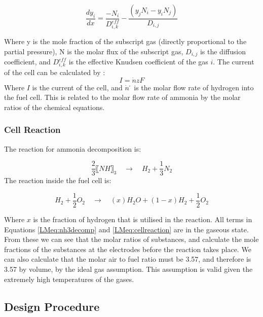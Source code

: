 \documentclass{article}
\begin{document}
\begin{equation}
\frac{dy_{i}}{dx}=  \frac{-N_i}{D_{i,k}^{eff}}  - \frac{(y_j N_i- y_i N_j)}{D_{i,j}}
\end{equation}

Where y is the mole fraction of the subscript gas (directly proportional to the partial pressure), N is the molar flux of the subscript gas, $D_{i,j}$ is the diffusion coefficient, and $D_{i,k}^{eff}$ is the effective Knudsen coefficient of the gas $i$. 
The current of the cell can be calculated by \cite{LM2}:
\begin{equation}
I= \dot n zF					
\end{equation}
Where $I$ is the current of the cell, and $\dot n$ ̇ is the molar flow rate of hydrogen into the fuel cell. This is related to the molar flow rate of ammonia by the molar ratios of the chemical equations.


    \subsubsection{Cell Reaction}
    \label{LMcellreaction}
    The reaction for ammonia decomposition is:
    
    \begin{equation}
\frac{2}{3} 〖NH〗_3   \quad \rightarrow \quad   H_2 +  \frac{1}{3} N_2	
\label{LMeq:nh3decomp}
\end{equation}
\newline
\newline
The reaction inside the fuel cell is:

\begin{equation}
H_2+  \frac{1}{2} O_2   \quad \rightarrow \quad  (x)H_2 O + (1-x)H_2 +  \frac{1}{2} O_2
\label{LMeq:cellreaction}
\end{equation}

Where $x$ is the fraction of hydrogen that is utilised in the reaction. All terms in Equations \ref{LMeq:nh3decomp} and \ref{LMeq:cellreaction} are in the gaseous state. From these we can see that the molar ratios of substances, and calculate the mole fractions of the substances at the electrodes before the reaction takes place. We can also calculate that the molar air to fuel ratio must be 3.57, and therefore is 3.57 by volume, by the ideal gas assumption. This assumption is valid given the extremely high temperatures of the gases.


\subsection{Design Procedure}
\end{document}
